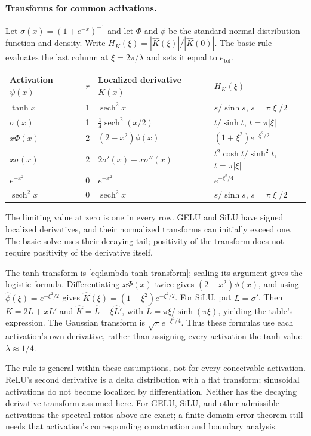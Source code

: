 \documentclass[11pt]{article}
\begin{document}
\paragraph{Transforms for common activations.}
Let $\sigma(x)=(1+e^{-x})^{-1}$ and let $\Phi$ and $\phi$ be the standard
normal distribution function and density. Write
$H_K(\xi)=|\widehat K(\xi)|/|\widehat K(0)|$. The basic rule evaluates the
last column at $\xi=2\pi/\lambda$ and sets it equal to $e_{\mathrm{tol}}$.
\begin{center}\small
\begin{tabularx}{\linewidth}{@{}lclX@{}}
\toprule
Activation $\psi(x)$ & $r$ & Localized derivative $K(x)$ & $H_K(\xi)$\\
\midrule
$\tanh x$ & 1 & $\operatorname{sech}^2x$ & $s/\sinh s$, $s=\pi|\xi|/2$\\[4pt]
$\sigma(x)$ & 1 & $\tfrac14\operatorname{sech}^2(x/2)$ & $t/\sinh t$, $t=\pi|\xi|$\\[4pt]
$x\Phi(x)$ & 2 & $(2-x^2)\phi(x)$ & $(1+\xi^2)e^{-\xi^2/2}$\\[4pt]
$x\sigma(x)$ & 2 & $2\sigma'(x)+x\sigma''(x)$ & $t^2\cosh t/\sinh^2t$, $t=\pi|\xi|$\\[4pt]
$e^{-x^2}$ & 0 & $e^{-x^2}$ & $e^{-\xi^2/4}$\\[4pt]
$\operatorname{sech}^2x$ & 0 & $\operatorname{sech}^2x$ & $s/\sinh s$, $s=\pi|\xi|/2$\\
\bottomrule
\end{tabularx}
\end{center}
The limiting value at zero is one in every row. GELU and SiLU have signed
localized derivatives, and their normalized transforms can initially exceed
one. The basic solve uses their decaying tail; positivity of the transform
does not require positivity of the derivative itself.

The tanh transform is \eqref{eq:lambda-tanh-transform}; scaling its argument
gives the logistic formula. Differentiating $x\Phi(x)$ twice gives
$(2-x^2)\phi(x)$, and using
$\widehat\phi(\xi)=e^{-\xi^2/2}$ gives
$\widehat K(\xi)=(1+\xi^2)e^{-\xi^2/2}$.
For SiLU, put $L=\sigma'$. Then $K=2L+xL'$ and
$\widehat K=\widehat L-\xi\widehat L'$, with
$\widehat L=\pi\xi/\sinh(\pi\xi)$, yielding the table's expression.
The Gaussian transform is $\sqrt\pi e^{-\xi^2/4}$.
Thus these formulas use each activation's own derivative, rather than assigning
every activation the tanh value $\lambda\approx1/4$.

The rule is general within these assumptions, not for every conceivable
activation. ReLU's second derivative is a delta distribution with a flat
transform; sinusoidal activations do not become localized by differentiation.
Neither has the decaying derivative transform assumed here. For GELU, SiLU,
and other admissible activations the spectral ratios above are exact; a
finite-domain error theorem still needs that activation's corresponding
construction and boundary analysis.
\end{document}
